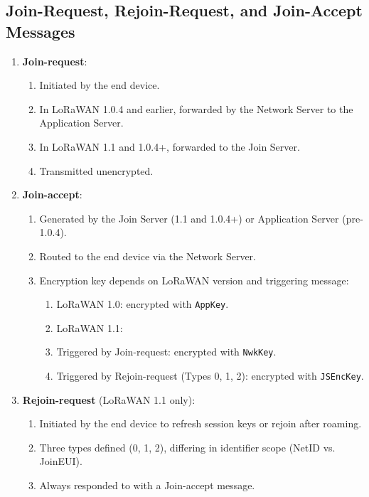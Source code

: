 \subsection{Join-Request, Rejoin-Request, and Join-Accept Messages}

\begin{enumerate}
    \item \textbf{Join-request}:
          \begin{enumerate}
              \item Initiated by the end device.
              \item In LoRaWAN 1.0.4 and earlier, forwarded by the Network Server to the Application Server.
              \item In LoRaWAN 1.1 and 1.0.4+, forwarded to the Join Server.
              \item Transmitted unencrypted.
          \end{enumerate}

    \item \textbf{Join-accept}:
          \begin{enumerate}
              \item Generated by the Join Server (1.1 and 1.0.4+) or Application Server (pre-1.0.4).
              \item Routed to the end device via the Network Server.
              \item Encryption key depends on LoRaWAN version and triggering message:
                    \begin{enumerate}
                        \item LoRaWAN 1.0: encrypted with \texttt{AppKey}.
                        \item LoRaWAN 1.1:
                        \item Triggered by Join-request: encrypted with \texttt{NwkKey}.
                        \item Triggered by Rejoin-request (Types 0, 1, 2): encrypted with \texttt{JSEncKey}.
                    \end{enumerate}
          \end{enumerate}

    \item \textbf{Rejoin-request} (LoRaWAN 1.1 only):
          \begin{enumerate}
              \item Initiated by the end device to refresh session keys or rejoin after roaming.
              \item Three types defined (0, 1, 2), differing in identifier scope (NetID vs. JoinEUI).
              \item Always responded to with a Join-accept message.
          \end{enumerate}
\end{enumerate}

